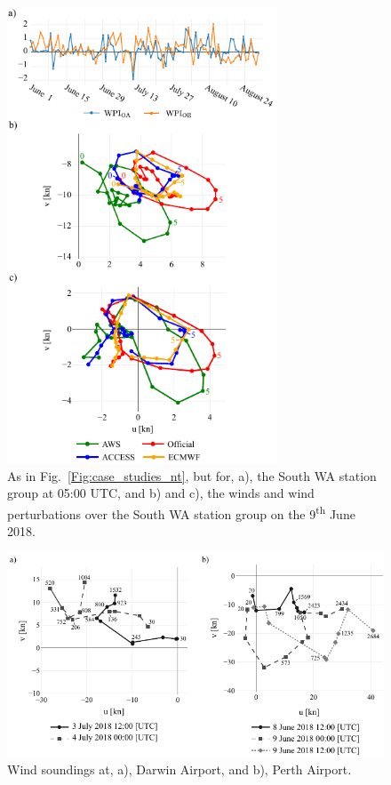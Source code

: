 \documentclass{ametsoc}
\begin{document}
\begin{figure}
\centering
\includegraphics[width=19pc]{case_studies_wa.pdf}
\caption{As in Fig.~\ref{Fig:case_studies_nt}, but for, a), the South WA station group at 05:00 UTC, and b) and c), the winds and wind perturbations over the South WA station group on the 9\textsuperscript{th} June 2018.} 
\label{Fig:case_studies_wa}
\end{figure}

\begin{figure}
\centering
\includegraphics[width=33pc]{perth_sounding.pdf}
\caption{Wind soundings at, a), Darwin Airport, and b), Perth Airport.}
\label{Fig:perth_sounding}
\end{figure}
\end{document}
